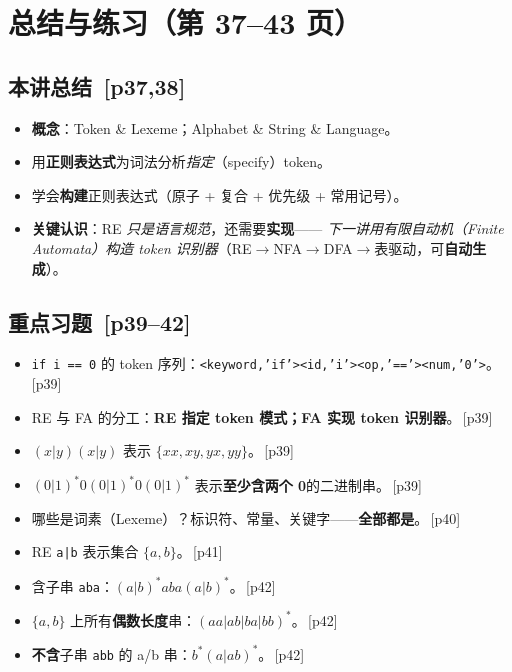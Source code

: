 \documentclass[UTF8,fontset=none,11pt]{ctexart}
\newcommand{\pg}[1]{{\small\color{gray}\,[p#1]}}
\begin{document}
\section{总结与练习（第 37--43 页）}

\subsection{本讲总结 \pg{37,38}}
\begin{itemize}
  \item \textbf{概念}：Token \& Lexeme；Alphabet \& String \& Language。
  \item 用\textbf{正则表达式}为词法分析\emph{指定}（specify）token。
  \item 学会\textbf{构建}正则表达式（原子 + 复合 + 优先级 + 常用记号）。
  \item \textbf{关键认识}：RE \emph{只是语言规范}，还需要\textbf{实现}——
        \emph{下一讲用有限自动机（Finite Automata）构造 token 识别器}（RE$\to$NFA$\to$DFA$\to$表驱动，可\textbf{自动生成}）。
\end{itemize}

\subsection{重点习题 \pg{39--42}}
\begin{itemize}
  \item \texttt{if i == 0} 的 token 序列：\;\texttt{<keyword,'if'><id,'i'><op,'=='><num,'0'>}。\pg{39}
  \item RE 与 FA 的分工：\textbf{RE 指定 token 模式；FA 实现 token 识别器}。\pg{39}
  \item $(x|y)(x|y)$ 表示 $\{xx,xy,yx,yy\}$。\pg{39}
  \item $(0|1)^{*}0(0|1)^{*}0(0|1)^{*}$ 表示\textbf{至少含两个 0}的二进制串。\pg{39}
  \item 哪些是词素（Lexeme）？\;标识符、常量、关键字——\textbf{全部都是}。\pg{40}
  \item RE \texttt{a|b} 表示集合 $\{a,b\}$。\pg{41}
  \item 含子串 \texttt{aba}：\;$(a|b)^{*}aba(a|b)^{*}$。\pg{42}
  \item $\{a,b\}$ 上所有\textbf{偶数长度}串：\;$(aa|ab|ba|bb)^{*}$。\pg{42}
  \item \textbf{不含}子串 \texttt{abb} 的 a/b 串：\;$b^{*}(a|ab)^{*}$。\pg{42}
\end{itemize}
\end{document}
